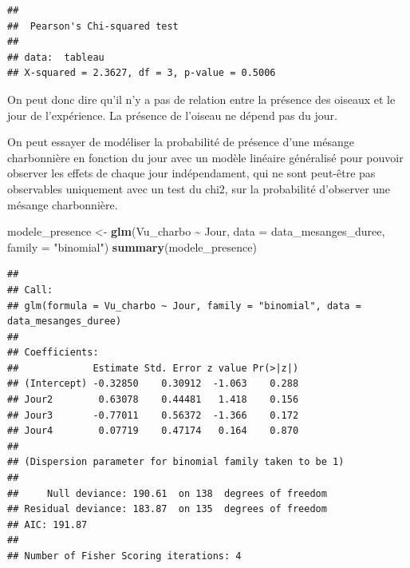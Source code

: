 \documentclass[
  french,
]{article}
\newenvironment{Shaded}{\begin{snugshade}}{\end{snugshade}}
\newcommand{\AttributeTok}[1]{\textcolor[rgb]{0.13,0.29,0.53}{#1}}
\newcommand{\DecValTok}[1]{\textcolor[rgb]{0.00,0.00,0.81}{#1}}
\newcommand{\FunctionTok}[1]{\textcolor[rgb]{0.13,0.29,0.53}{\textbf{#1}}}
\newcommand{\NormalTok}[1]{#1}
\newcommand{\OtherTok}[1]{\textcolor[rgb]{0.56,0.35,0.01}{#1}}
\newcommand{\SpecialCharTok}[1]{\textcolor[rgb]{0.81,0.36,0.00}{\textbf{#1}}}
\newcommand{\StringTok}[1]{\textcolor[rgb]{0.31,0.60,0.02}{#1}}
\begin{document}
\begin{Shaded}
\end{Shaded}

\begin{verbatim}
## 
##  Pearson's Chi-squared test
## 
## data:  tableau
## X-squared = 2.3627, df = 3, p-value = 0.5006
\end{verbatim}

On peut donc dire qu'il n'y a pas de relation entre la présence des
oiseaux et le jour de l'expérience. La présence de l'oiseau ne dépend
pas du jour.

On peut essayer de modéliser la probabilité de présence d'une mésange
charbonnière en fonction du jour avec un modèle linéaire généralisé pour
pouvoir observer les effets de chaque jour indépendament, qui ne sont
peut-être pas observables uniquement avec un test du chi2, sur la
probabilité d'observer une mésange charbonnière.

\begin{Shaded}
\begin{Highlighting}[]
\NormalTok{modele\_presence }\OtherTok{\textless{}{-}} \FunctionTok{glm}\NormalTok{(Vu\_charbo }\SpecialCharTok{\textasciitilde{}}\NormalTok{ Jour, }\AttributeTok{data =}\NormalTok{ data\_mesanges\_duree, }\AttributeTok{family =} \StringTok{"binomial"}\NormalTok{)}
\FunctionTok{summary}\NormalTok{(modele\_presence)}
\end{Highlighting}
\end{Shaded}

\begin{verbatim}
## 
## Call:
## glm(formula = Vu_charbo ~ Jour, family = "binomial", data = data_mesanges_duree)
## 
## Coefficients:
##             Estimate Std. Error z value Pr(>|z|)
## (Intercept) -0.32850    0.30912  -1.063    0.288
## Jour2        0.63078    0.44481   1.418    0.156
## Jour3       -0.77011    0.56372  -1.366    0.172
## Jour4        0.07719    0.47174   0.164    0.870
## 
## (Dispersion parameter for binomial family taken to be 1)
## 
##     Null deviance: 190.61  on 138  degrees of freedom
## Residual deviance: 183.87  on 135  degrees of freedom
## AIC: 191.87
## 
## Number of Fisher Scoring iterations: 4
\end{verbatim}
\end{document}
